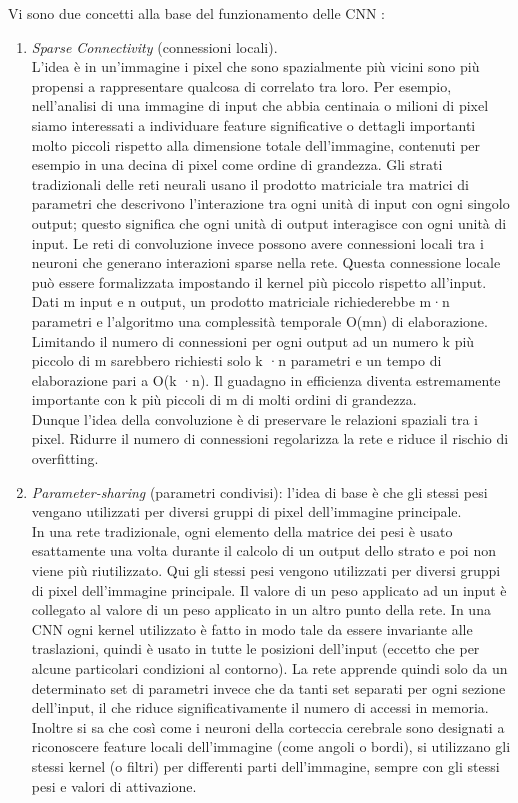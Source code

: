 Vi sono due concetti alla base del funzionamento delle CNN :\\
\begin{enumerate}
     \item \emph{Sparse Connectivity} (connessioni locali).\\
L’idea è in un’immagine i pixel che sono spazialmente più vicini sono più propensi a rappresentare
 qualcosa di correlato tra loro. 
Per esempio, nell’analisi di una immagine di input che abbia centinaia o milioni di pixel 
siamo interessati a individuare feature significative o dettagli importanti molto piccoli
 rispetto alla dimensione totale dell’immagine, contenuti per esempio in una decina di pixel 
 come ordine di grandezza.
Gli strati tradizionali delle reti neurali usano il prodotto matriciale tra matrici di parametri
 che descrivono l’interazione tra ogni unità di input con ogni singolo output; questo significa
  che ogni unità di output interagisce con ogni unità di input.
   Le reti di convoluzione invece possono avere connessioni locali tra i neuroni che generano 
   interazioni sparse nella rete. Questa connessione locale può essere formalizzata impostando 
   il kernel più piccolo rispetto all'input. 
Dati m input e n output, un prodotto matriciale richiederebbe m·n parametri e l’algoritmo 
una complessità temporale O(mn) di elaborazione. Limitando il numero di connessioni per ogni 
output ad un numero k più piccolo di m sarebbero richiesti solo k ·n parametri e un tempo di 
elaborazione pari a O(k ·n). Il guadagno in efficienza diventa estremamente importante con k
 più piccoli di m di molti ordini di grandezza.\\
  Dunque l’idea della convoluzione è di preservare le relazioni spaziali tra i pixel. 
Ridurre il numero di connessioni regolarizza la rete e riduce il rischio di overfitting. 

\item \emph{Parameter-sharing} (parametri condivisi): l'idea di base è che gli stessi pesi
 vengano utilizzati per diversi gruppi di pixel dell’immagine principale.\\
In una rete tradizionale, ogni elemento della matrice dei pesi è usato esattamente
 una volta durante il calcolo di un output dello strato e poi non viene più riutilizzato. 
 Qui gli stessi pesi vengono utilizzati per diversi gruppi di pixel dell’immagine principale.
  Il valore di un peso applicato ad un input è collegato al valore di un peso applicato in 
  un altro punto della rete. In una CNN ogni kernel utilizzato è fatto in modo tale da essere 
  invariante alle traslazioni, quindi è usato in tutte le posizioni dell’input 
  (eccetto che per alcune particolari condizioni al contorno). 
  La rete apprende quindi solo da un determinato set di parametri invece che da tanti 
  set separati per ogni sezione dell’input, il che riduce significativamente 
  il numero di accessi in memoria.  Inoltre si sa che così come i neuroni della corteccia
   cerebrale sono designati a riconoscere feature locali dell’immagine (come angoli o bordi), 
   si utilizzano gli stessi kernel (o filtri) per differenti parti dell’immagine, 
   sempre con gli stessi pesi e valori di attivazione. 

\end{enumerate}
